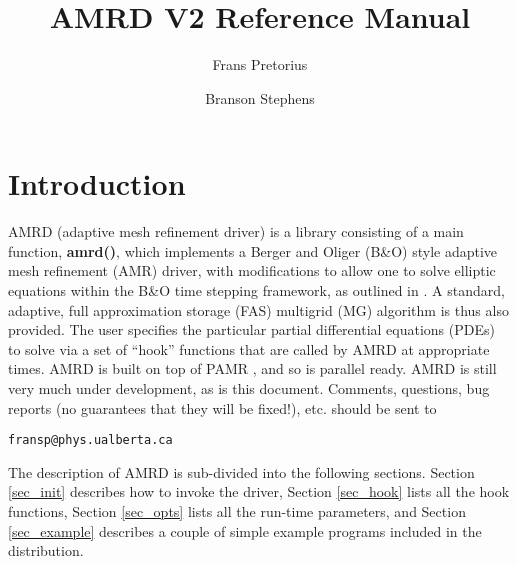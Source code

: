\documentclass[aps,amssymb,unsortedaddress,nofootinbib]{revtex4}
\begin{document}
\title{AMRD V2 Reference Manual}

\author{Frans Pretorius}

\address{Department of Physics \\
Princeton University\\
Princeton, NJ, 08544}

\author{Branson Stephens}

\address{Department of Physics \\
Princeton University\\
Princeton, NJ, 08544}

\maketitle

\tableofcontents

\section{Introduction}

AMRD (adaptive mesh refinement driver) is a library consisting of a
main function, {\bf amrd()}, which implements a Berger and Oliger (B\&O)
style adaptive mesh refinement (AMR) driver, with modifications to
allow one to solve elliptic equations within the B\&O time stepping framework,
as outlined in \cite{fpthesis}. A standard, adaptive, 
full approximation storage (FAS) multigrid (MG) algorithm is thus 
also provided.  The user specifies the particular 
partial differential equations (PDEs) to solve via a set of ``hook'' functions
that are called by AMRD at appropriate times. AMRD is built on top of 
PAMR \cite{pamr}, and so is parallel ready.
AMRD is still very much under development, as is this document. Comments, questions,
bug reports (no guarantees that they will be fixed!), etc. should be
sent to
\begin{verbatim}
fransp@phys.ualberta.ca
\end{verbatim}

The description of AMRD is sub-divided into the following sections. 
Section \ref{sec_init} describes how to invoke the driver, Section
\ref{sec_hook} lists all the hook functions, Section \ref{sec_opts}
lists all the run-time parameters, and Section \ref{sec_example}
describes a couple of simple example programs included in the distribution. 
\end{document}
